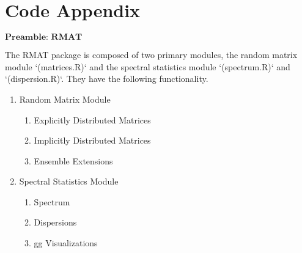 \chapter{Code Appendix}

$\textbf{Preamble: RMAT}$ \hfill

\noindent
The RMAT package is composed of two primary modules, the random matrix module `(matrices.R)` and the spectral statistics module `(spectrum.R)` and `(dispersion.R)`. They have the following functionality.

\begin{enumerate}
  \item Random Matrix Module
    \begin{enumerate}
      \item Explicitly Distributed Matrices
      \item Implicitly Distributed Matrices
      \item Ensemble Extensions
    \end{enumerate}
  
  \item Spectral Statistics Module
    \begin{enumerate}
      \item Spectrum
      \item Dispersions
      \item gg Visualizations
    \end{enumerate}
\end{enumerate}

